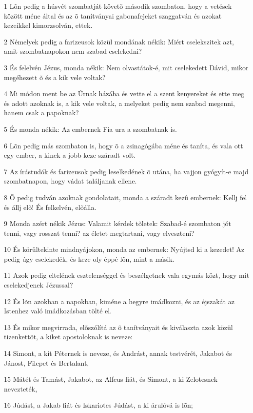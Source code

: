 \par 1 Lõn pedig a húsvét szombatját követõ második szombaton, hogy a vetések között méne által és az õ tanítványai  gabonafejeket szaggatván és azokat kezeikkel kimorzsolván, ettek.
\par 2 Némelyek pedig a farizeusok közül mondának nékik: Miért cselekszitek azt, amit szombatnapokon nem szabad cselekedni?
\par 3 És felelvén Jézus, monda nékik: Nem olvastátok-é, mit cselekedett Dávid, mikor megéhezett õ és a kik vele voltak?
\par 4 Mi módon ment be az Úrnak házába és vette el a szent kenyereket és ette meg és adott azoknak is, a kik vele voltak, a melyeket pedig nem szabad megenni, hanem csak a papoknak?
\par 5 És monda nékik: Az embernek Fia ura a szombatnak is.
\par 6 Lõn pedig más szombaton is, hogy õ a zsinagógába méne és taníta, és vala ott egy ember, a kinek a jobb keze száradt volt.
\par 7 Az írástudók és farizeusok pedig leselkedének õ utána, ha vajjon gyógyít-e majd szombatnapon, hogy vádat találjanak ellene.
\par 8 Õ pedig tudván azoknak gondolatait, monda a száradt kezû embernek: Kellj fel és állj elõ! És felkelvén, elõálla.
\par 9 Monda azért nékik Jézus: Valamit kérdek tõletek: Szabad-é szombaton jót tenni, vagy rosszat tenni? az életet megtartani, vagy elveszteni?
\par 10 És körültekinte mindnyájokon, monda az embernek: Nyújtsd ki a kezedet! Az pedig úgy cselekedék, és keze oly éppé lõn, mint a másik.
\par 11 Azok pedig eltelének esztelenséggel és beszélgetnek vala egymás közt, hogy mit cselekedjenek Jézussal?
\par 12 És lõn azokban a napokban, kiméne a hegyre imádkozni, és az éjszakát az Istenhez való imádkozásban tölté el.
\par 13 És mikor megvirrada, elõszólítá az õ tanítványait és kiválaszta azok közül tizenkettõt, a kiket apostoloknak is neveze:
\par 14 Simont, a kit Péternek is neveze, és Andrást, annak testvérét, Jakabot és Jánost, Filepet és Bertalant,
\par 15 Mátét és Tamást, Jakabot, az Alfeus fiát, és Simont, a ki Zelotesnek nevezteték,
\par 16 Júdást, a Jakab fiát és Iskariotes Júdást, a ki árulóvá is lõn;
